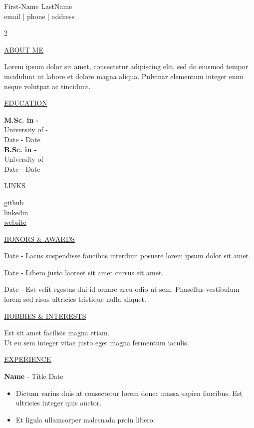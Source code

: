 \documentclass[11pt]{article}
\newcommand{\resumetitle}[3]{
    \AddToShipoutPictureBG{
        \AtPageUpperLeft {
        \raisebox{-0.09\paperheight}{
            \color{black!85}\rule{2\paperwidth}{\paperheight}}
        }}
    \begin{Center}
        \begingroup
        \titlethin
        \color{black!10}\Huge{#1}
        \titlethick
        \color{black!5}\Huge{#2} \\
        \vspace{2mm}
        \textrm{\color{black!15}\Large{#3}}
        \endgroup
    \end{Center}
    \vspace{7mm}
}
\newcommand{\betteruline}[1]{
    \uline{#1}
}
\newcommand{\sectiontitle}[1]{
    \begingroup
        \titlebold
        \betteruline{\Large\uppercase{#1}  }
        \vspace{1.7mm}
    \endgroup
}
\newcommand{\sectioncontent}[1]{
    \begingroup
        \begin{FlushLeft}
        \vspace{-3mm}
        \sffamily\small#1
        \end{FlushLeft}
    \endgroup
    \vspace{2mm}
}
\newcommand{\job}[3]{
    \begingroup
        \textbf{\small#1} - \small#2
        \hfill\color{black!70}\small{#3}
    \endgroup
}
\newcommand{\spacevv}{
    \vspace{2mm}
}
\newcommand{\honor}[2]{
    \textcolor{black!70}{#1} - #2 \\
    \vspace{1.5mm}
}
\begin{document}
\resumetitle{First-Name}{LastName} {
	email |
	phone |
	address
}

\setlength{\columnsep}{7mm}
\begin{paracol}{2}

	\sectiontitle{about me}
	\sectioncontent{
		Lorem ipsum dolor sit amet, consectetur adipiscing elit, sed do eiusmod tempor incididunt ut labore et dolore magna aliqua. Pulvinar elementum integer enim neque volutpat ac tincidunt.
	}

	\sectiontitle{education}
	\sectioncontent{
		\textbf{M.Sc. in -} \\
		University of - \\
		\textcolor{black!70}{Date - Date} \\
		\vspace{2mm}
		\textbf{B.Sc. in -} \\
		University of - \\
		\textcolor{black!70}{Date - Date} \\
	}

	\sectiontitle{links}
	\sectioncontent{
		\hspace{2mm}
		\href{example.com}{github} \\
		\faIcon{linkedin-in}\hspace{2.1mm}
		\href{example.com}{linkedin} \\
		\faIcon{link}\hspace{1.8mm}
		\href{example.com}{website}
	}

	\sectiontitle{Honors \& Awards}
	\sectioncontent{
		\honor{Date}{Lacus suspendisse faucibus interdum posuere lorem ipsum dolor sit amet.}
		\honor{Date}{ Libero justo laoreet sit amet cursus sit amet.}
		\honor{Date}{ Est velit egestas dui id ornare arcu odio ut sem. Phasellus vestibulum lorem sed risus ultricies tristique nulla aliquet.}

	}

	\sectiontitle{Hobbies \& Interests}
	\sectioncontent{
		Est sit amet facilisis magna etiam.\\
		Ut eu sem integer vitae justo eget magna fermentum iaculis. \\
	}

	\switchcolumn

	\sectiontitle{experience}
	\sectioncontent{

		\job{Name}{Title}{Date}
		\begin{itemize}
			\item Dictum varius duis at consectetur lorem donec massa sapien faucibus. Est ultricies integer quis auctor.
			\item Et ligula ullamcorper malesuada proin libero.
		\end{itemize}
		\spacevv

}
\end{paracol}
\end{document}
